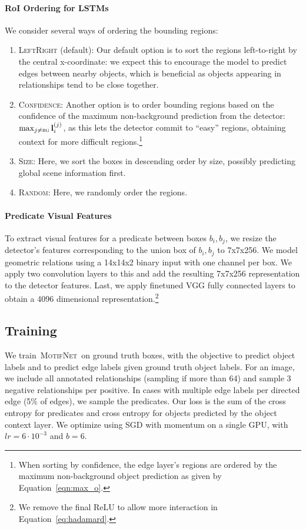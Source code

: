 \documentclass[10pt,twocolumn,letterpaper]{article}
\newcommand{\model}{\textsc{MotifNet}}
\newcommand{\bg}{\textsc{bg}}  %
\newcommand{\vect}[1]{\mathbf{#1}}   %
\begin{document}
\paragraph{RoI Ordering for LSTMs}
We consider several ways of ordering the bounding regions:
\begin{enumerate}[label={(\arabic*)},noitemsep,nolistsep]
  \setlength{\parskip}{0pt}
  \setlength{\parsep}{0pt}
    \item \textsc{LeftRight} (default): Our default option is to sort the regions left-to-right by the central x-coordinate: we expect this to encourage the model to predict edges between nearby objects, which is beneficial as objects appearing in relationships tend to be close together.
    \item \textsc{Confidence}: Another option is to order bounding regions based on the confidence of the maximum non-background prediction from the detector: $\max_{j \ne \bg} \vect{l}_i^{(j)}$, as this lets the detector commit to ``easy'' regions, obtaining context for more difficult regions.\footnote{When sorting by confidence, the edge layer's regions are ordered by the maximum non-background object prediction as given by Equation~\ref{eqn:max_o}.}
    \item \textsc{Size}: Here, we sort the boxes in descending order by size, possibly predicting global scene information first.
    \item \textsc{Random}: Here, we randomly order the regions.
\end{enumerate}\paragraph{Predicate Visual Features} To extract visual features for a predicate between boxes $b_i, b_j$, we resize the detector's features corresponding to the union box of $b_i,b_j$ to 7x7x256. We model geometric relations using a 14x14x2 binary input with one channel per box. We apply two convolution layers to this and add the resulting 7x7x256 representation to the detector features. Last, we apply finetuned VGG fully connected layers to obtain a 4096 dimensional representation.\footnote{We remove the final ReLU to allow more interaction in Equation~\ref{eq:hadamard}.}\subsection{Training}\label{subsec:setup:training}
We train~\model~on ground truth boxes, with the objective to predict object labels and to predict edge labels given ground truth object labels. For an image, we include all annotated relationships (sampling if more than 64) and sample 3 negative relationships per positive.
In cases with multiple edge labels per directed edge (5\% of edges), we sample the predicates. Our loss is the sum of the cross entropy for predicates and cross entropy for objects predicted by the object context layer. We optimize using SGD with momentum on a single GPU, with $lr=6\cdot10^{-3}$ and $b=6$.
\end{document}
